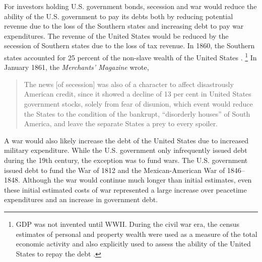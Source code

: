 \documentclass[]{article}\usepackage[]{graphicx}\usepackage[]{color}
\begin{document}
For investors holding U.S. government bonds, secession and war would reduce the ability of the U.S. government to pay its debts both by reducing potential revenue due to the loss of the Southern states and increasing debt to pay war expenditures.
The revenue of the United States would be reduced by the secession of Southern states due to the loss of tax revenue. In 1860, the Southern states accounted for 25 percent of the non-slave wealth of the United States \parencite[11]{Elder1865}.%
\footnote{GDP was not invented until WWII.
  During the civil war era, the census estimates of personal and property wealth were used as a measure of the total economic activity and also explicitly used to assess the ability of the United States to repay the debt \parencites{Elder1863}{Elder1865}.
}
In January 1861, the \textit{Merchants' Magazine} wrote,
\begin{quote}
   The news [of secession] was also of a character to affect disastrously American credit, since it showed a decline of 13 per cent in United States government stocks, solely from fear of disunion, which event would reduce the States to the condition of the bankrupt, ``disorderly houses'' of South America, and leave the separate States a prey to every spoiler. \parencite[79]{HomansDana1861a}
\end{quote}
A war would also likely increase the debt of the United States due to increased military expenditure.
While the U.S. government only infrequently issued debt during the 19th century, the exception was to fund wars.
The U.S. government issued debt to fund the War of 1812 and the Mexican-American War of 1846--1848.
Although the war would continue much longer than initial estimates, even these initial estimated costs of war represented a large increase over peacetime expenditures and an increase in government debt.
\end{document}
